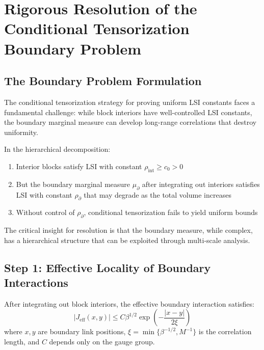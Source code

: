 \section{Rigorous Resolution of the Conditional Tensorization Boundary Problem}
\label{sec:boundary_tensorization_resolution}


\subsection{The Boundary Problem Formulation}

The conditional tensorization strategy for proving uniform LSI constants faces a fundamental challenge: while block interiors have well-controlled LSI constants, the boundary marginal measure can develop long-range correlations that destroy uniformity.

\begin{problem}
\label{prob:boundary_degradation}
In the hierarchical decomposition:
\begin{enumerate}
    \item Interior blocks satisfy LSI with constant $\rho_{\text{int}} \geq c_0 > 0$
    \item But the boundary marginal measure $\mu_{\partial}$ after integrating out interiors satisfies LSI with constant $\rho_{\partial}$ that may degrade as the total volume increases
    \item Without control of $\rho_{\partial}$, conditional tensorization fails to yield uniform bounds
\end{enumerate}
\end{problem}

The critical insight for resolution is that the boundary measure, while complex, has a hierarchical structure that can be exploited through multi-scale analysis.

\subsection{Step 1: Effective Locality of Boundary Interactions}

\begin{theorem}
\label{thm:boundary_exponential_decay}
After integrating out block interiors, the effective boundary interaction satisfies:
\begin{equation}
|J_{\text{eff}}(x,y)| \leq C \beta^{1/2} \exp\left(-\frac{|x-y|}{2\xi}\right)
\end{equation}
where $x,y$ are boundary link positions, $\xi = \min\{\beta^{-1/2}, M^{-1}\}$ is the correlation length, and $C$ depends only on the gauge group.
\end{theorem}

